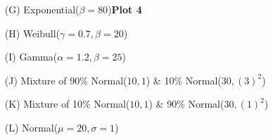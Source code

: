 \documentclass[10pt]{report}
\def\vvn{\vskip2mm\noindent}
\begin{document}
\begin{enumerate}
\begin{enumerate}
\item[(G)] Exponential($\beta=80$)\hskip2.76in{\bf \large Plot 4 \underbar { \  \
    \  \  \  \  \ \  \  \  \  \  \  \ }}
\item[(H)] Weibull($\gamma=0.7,\beta=20$)
\item[(I)] Gamma($\alpha=1.2,\beta=25$)
\item[(J)] Mixture of 90\% Normal($10,1$) \& 10\% Normal($30,(3)^2$)
\item[(K)] Mixture of 10\% Normal($10,1$) \& 90\% Normal($30,(1)^2$)
\item[(L)] Normal($\mu=20,\sigma=1$)
\end{enumerate}
\vskip4mm
\begin{center}
\noindent
{}
\end{center}
\vvn\vvn


\end{enumerate}
\end{document}
